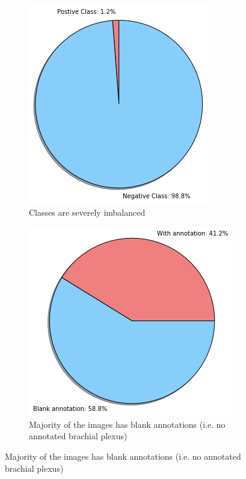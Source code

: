\documentclass{article}
\begin{document}
\begin{figure}[h]
    \centering
    \begin{subfigure}[b]{0.8\linewidth}
        \includegraphics[width=1.0\linewidth]{figures/distribution_1.png}
        \caption{Classes are severely imbalanced}
        \label{fig:distribution_1}
    \end{subfigure}

   \begin{subfigure}[b]{0.9\linewidth}
        \includegraphics[width=1.0\linewidth]{figures/distribution_2.png}
        \caption{Majority of the images has blank annotations (i.e. no annotated brachial plexus)}
        \label{fig:distribution_2}
    \end{subfigure}


\end{figure}
\end{document}
